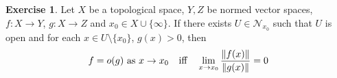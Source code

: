 \documentclass[12pt]{amsart}
\theoremstyle{definition}
\theoremstyle{remark}
\theoremstyle{definition}
\newtheorem{ex}[definition]{Exercise}
\newcommand{\MN}{\mathcal{N}}
\begin{document}
	\begin{ex}
	Let $X$ be a topological space, $Y, Z$ be normed vector spaces, $f:X \rightarrow Y$, $g: X \rightarrow Z$ and $x_0 \in X \cup \{\infty\}$. If there exists $U \in \MN_{x_0}$ such that $U$ is open and for each $x \in U \setminus \{x_0\}$, $g(x) > 0$, then $$f = o(g) \text{ as } x \rightarrow x_0 \hspace{.25cm} \text{ iff } \hspace{.25cm}  \lim_{x \rightarrow x_0} \frac{\| f(x) \|}{\| g(x) \|} = 0$$
	\end{ex}	
	
	
	
	
	
	
	
	
	
	
	
\end{document}

